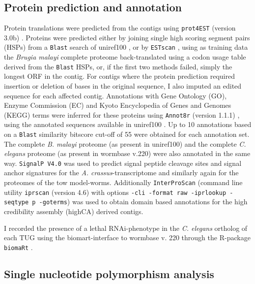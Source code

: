 \subsection{Protein prediction and annotation}
\label{pro4est}

Protein translations were predicted from the contigs using
\texttt{prot4EST} (version 3.0b)
\cite{wasmuth_prot4est:_2004}. Proteins were predicted either by
joining single high scoring segment pairs (HSPs) from a \texttt{Blast}
search of uniref100 \cite{pmid18836194}, or by \texttt{ESTscan}
\cite{estscan}, using as training data the \textit{Brugia malayi}
complete proteome back-translated using a codon usage table derived
from the \texttt{Blast} HSPs, or, if the first two methods failed,
simply the longest ORF in the contig. For contigs where the protein
prediction required insertion or deletion of bases in the original
sequence, I also imputed an edited sequence for each affected
contig. Annotations with Gene Ontology (GO), Enzyme Commission (EC)
and Kyoto Encyclopedia of Genes and Genomes (KEGG) terms were inferred
for these proteins using \texttt{Annot8r} (version 1.1.1)
\cite{schmid_annot8r:_2008}, using the annotated sequences available
in uniref100 \cite{pmid18836194}. Up to 10 annotations based on a
\texttt{Blast} similarity bitscore cut-off of 55 were obtained for
each annotation set. The complete \textit{B. malayi} proteome (as
present in uniref100) and the complete \textit{C. elegans} proteome
(as present in wormbase v.220) were also annotated in the same
way. \texttt{SignalP V4.0} \cite{pmid21959131} was used to predict
signal peptide cleavage sites and signal anchor signatures for the
\textit{A. crassus}-transcriptome and similarly again for the
proteomes of the tow model-worms.  Additionally \texttt{InterProScan}
\cite{pmid11590104} (command line utility \texttt{iprscan} (version
4.6) with options \texttt{-cli -format raw -iprlookup -seqtype p
  -goterms}) was used to obtain domain based annotations for the high
credibility assembly (highCA) derived contigs.

I recorded the presence of a lethal RNAi-phenotype in the
\textit{C. elegans} ortholog of each TUG using the biomart-interface
\cite{pmid22083790} to wormbase v. 220 through the R-package
\texttt{biomaRt} \cite{pmid19617889}.

\subsection{Single nucleotide polymorphism analysis}

